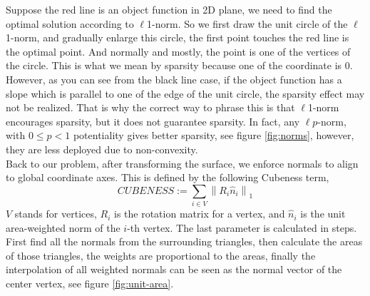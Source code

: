 \documentclass[a4paper,10pt]{article}
\begin{document}
Suppose the red line is an object function in 2D plane, we need to find the optimal solution according to $\ell$1-norm. So we first draw the unit circle of the $\ell$1-norm, and gradually enlarge this circle, the first point touches the red line is the optimal point. And normally and mostly, the point is one of the vertices of the circle. This is what we mean by sparsity because one of the coordinate is 0. However, as you can see from the black line case, if the object function has a slope which is parallel to one of the edge of the unit circle, the sparsity effect may not be realized. That is why the correct way to phrase this is that $\ell$1-norm encourages sparsity, but it does not guarantee sparsity. In fact, any $\ell$$p$-norm, with $0\leq p <1$ potentiality gives better sparsity, see figure \ref{fig:norms}, however, they are less deployed due to non-convexity. \\

Back to our problem, after transforming the surface, we enforce normals to align to global coordinate axes. This is defined by the following Cubeness term,
	\begin{equation*}
  		CUBENESS := \sum_{i\in V} \left\lVert R_i \hat{n}_i\right\rVert _1
	\end{equation*}
$V$ stands for vertices, $R_i$ is the rotation matrix for a vertex, and $\hat{n}_i$ is the unit area-weighted norm of the $i$-th vertex. The last parameter is calculated in steps. First find all the normals from the surrounding triangles, then calculate the areas of those triangles, the weights are proportional to the areas, finally the interpolation of all weighted normals can be seen as the normal vector of the center vertex, see figure \ref{fig:unit-area}. \\
\end{document}
